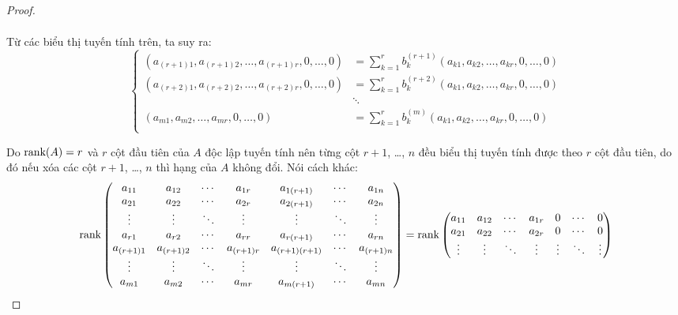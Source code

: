 \documentclass[class=linear-algebra,crop=false]{standalone}
\begin{document}
\begin{proof}
\begin{align*}
	\end{align*}
	\par Từ các biểu thị tuyến tính trên, ta suy ra:
	\[
		\begin{cases}
			(a_{(r+1)1}, a_{(r+1)2}, \ldots, a_{(r+1)r}, 0, \ldots, 0) & = \sum^{r}_{k=1}b_{k}^{(r+1)}(a_{k1}, a_{k2}, \ldots, a_{kr}, 0, \ldots, 0) \\
			(a_{(r+2)1}, a_{(r+2)2}, \ldots, a_{(r+2)r}, 0, \ldots, 0) & = \sum^{r}_{k=1}b_{k}^{(r+2)}(a_{k1}, a_{k2}, \ldots, a_{kr}, 0, \ldots, 0) \\
			                                                           & \ddots                                                                      \\
			(a_{m1}, a_{m2}, \ldots, a_{mr}, 0, \ldots, 0)             & = \sum^{r}_{k=1}b_{k}^{(m)}(a_{k1}, a_{k2}, \ldots, a_{kr}, 0, \ldots, 0)   \\
		\end{cases}
		\tag{$\star$}
	\]
	\par Do $\text{rank}(A) = r$ và $r$ cột đầu tiên của $A$ độc lập tuyến tính nên từng cột $r+1$, \ldots, $n$ đều biểu thị tuyến tính được theo $r$ cột đầu tiên, do đó nếu xóa các cột $r+1$, \ldots, $n$ thì hạng của $A$ không đổi. Nói cách khác:
	\[
		\text{rank}
		\begin{pmatrix}
			a_{11}     & a_{12}     & \cdots & a_{1r}     & a_{1(r+1)}     & \cdots & a_{1n}     \\
			a_{21}     & a_{22}     & \cdots & a_{2r}     & a_{2(r+1)}     & \cdots & a_{2n}     \\
			\vdots     & \vdots     & \ddots & \vdots     & \vdots         & \ddots & \vdots     \\
			a_{r1}     & a_{r2}     & \cdots & a_{rr}     & a_{r(r+1)}     & \cdots & a_{rn}     \\
			a_{(r+1)1} & a_{(r+1)2} & \cdots & a_{(r+1)r} & a_{(r+1)(r+1)} & \cdots & a_{(r+1)n} \\
			\vdots     & \vdots     & \ddots & \vdots     & \vdots         & \ddots & \vdots     \\
			a_{m1}     & a_{m2}     & \cdots & a_{mr}     & a_{m(r+1)}     & \cdots & a_{mn}
		\end{pmatrix}
		=
		\text{rank}
		\begin{pmatrix}
			a_{11}     & a_{12}     & \cdots & a_{1r}     & 0      & \cdots & 0      \\
			a_{21}     & a_{22}     & \cdots & a_{2r}     & 0      & \cdots & 0      \\
			\vdots     & \vdots     & \ddots & \vdots     & \vdots & \ddots & \vdots \\

\end{pmatrix}\]
\end{proof}
\end{document}
